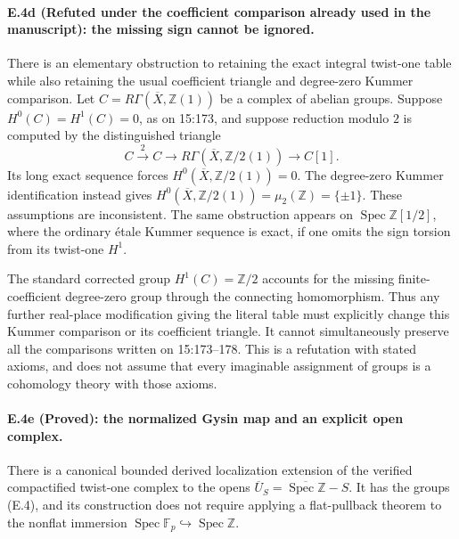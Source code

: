 \paragraph{E.4d (Refuted under the coefficient comparison already used in the manuscript): the missing sign cannot be ignored.}
There is an elementary obstruction to retaining the exact integral
twist-one table while also retaining the usual coefficient triangle and
degree-zero Kummer comparison. Let $C=R\Gamma(\overline X,\mathbb Z(1))$
be a complex of abelian groups. Suppose
$H^0(C)=H^1(C)=0$, as on 15:173, and suppose reduction modulo $2$ is
computed by the distinguished triangle
\[
 C\xrightarrow{2}C\longrightarrow
       R\Gamma(\overline X,\mathbb Z/2(1))\longrightarrow C[1].
\]
Its long exact sequence forces
$H^0(\overline X,\mathbb Z/2(1))=0$.
The degree-zero Kummer identification instead gives
$H^0(\overline X,\mathbb Z/2(1))=\mu_2(\mathbb Z)=\{\pm1\}$.
These assumptions are inconsistent. The same obstruction appears on
$\operatorname{Spec}\mathbb Z[1/2]$, where the ordinary \'etale Kummer
sequence is exact, if one omits the sign torsion from its twist-one
$H^1$.

The standard corrected group $H^1(C)=\mathbb Z/2$ accounts for the
missing finite-coefficient degree-zero group through the connecting
homomorphism. Thus any further real-place modification giving the
literal table must explicitly change this Kummer comparison or its
coefficient triangle. It cannot simultaneously preserve all the
comparisons written on 15:173--178. This is a refutation with stated
axioms, and does not assume that every imaginable assignment of groups
is a cohomology theory with those axioms.

\paragraph{E.4e (Proved): the normalized Gysin map and an explicit open complex.}
There is a canonical bounded derived localization extension of the
verified compactified twist-one complex to the opens
$\overline U_S=\overline{\operatorname{Spec}\mathbb Z}-S$.
It has the groups (E.4), and its construction does not require applying
a flat-pullback theorem to the nonflat immersion
$\operatorname{Spec}\mathbb F_p\hookrightarrow\operatorname{Spec}\mathbb Z$.

